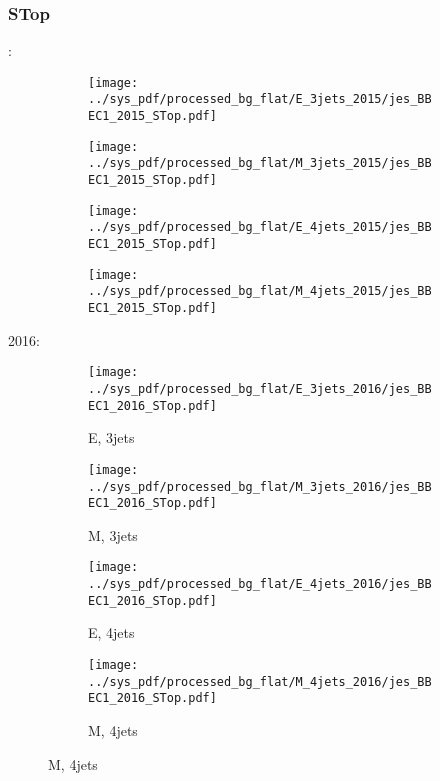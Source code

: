 \documentclass{beamer}
\begin{document}
\begin{frame}
\frametitle{STop}
\fontsize{5}{1}:
\begin{figure}
\centering
\begin{subfigure}[b]{0.24\textwidth}
\texttt{[image: ../sys\_pdf/processed\_bg\_flat/E\_3jets\_2015/jes\_BBEC1\_2015\_STop.pdf]}
\end{subfigure}
\begin{subfigure}[b]{0.24\textwidth}
\texttt{[image: ../sys\_pdf/processed\_bg\_flat/M\_3jets\_2015/jes\_BBEC1\_2015\_STop.pdf]}
\end{subfigure}
\begin{subfigure}[b]{0.24\textwidth}
\texttt{[image: ../sys\_pdf/processed\_bg\_flat/E\_4jets\_2015/jes\_BBEC1\_2015\_STop.pdf]}
\end{subfigure}
\begin{subfigure}[b]{0.24\textwidth}
\texttt{[image: ../sys\_pdf/processed\_bg\_flat/M\_4jets\_2015/jes\_BBEC1\_2015\_STop.pdf]}
\end{subfigure}
\end{figure}
2016:
\begin{figure}
\centering
\begin{subfigure}[b]{0.24\textwidth}
\texttt{[image: ../sys\_pdf/processed\_bg\_flat/E\_3jets\_2016/jes\_BBEC1\_2016\_STop.pdf]}
\captionsetup{font=tiny}
\caption{E, 3jets}
\end{subfigure}
\begin{subfigure}[b]{0.24\textwidth}
\texttt{[image: ../sys\_pdf/processed\_bg\_flat/M\_3jets\_2016/jes\_BBEC1\_2016\_STop.pdf]}
\captionsetup{font=tiny}
\caption{M, 3jets}
\end{subfigure}
\begin{subfigure}[b]{0.24\textwidth}
\texttt{[image: ../sys\_pdf/processed\_bg\_flat/E\_4jets\_2016/jes\_BBEC1\_2016\_STop.pdf]}
\captionsetup{font=tiny}
\caption{E, 4jets}
\end{subfigure}
\begin{subfigure}[b]{0.24\textwidth}
\texttt{[image: ../sys\_pdf/processed\_bg\_flat/M\_4jets\_2016/jes\_BBEC1\_2016\_STop.pdf]}
\captionsetup{font=tiny}
\caption{M, 4jets}
\end{subfigure}
\end{figure}
\end{frame}
\end{document}
